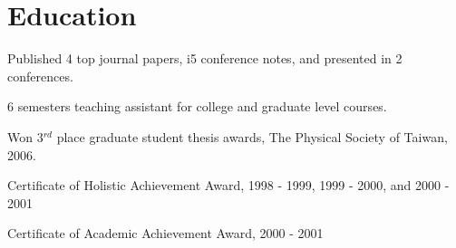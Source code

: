 \documentclass[letterpaper]{deedy-resume-openfont}
\begin{document}


\section{Education} 

\begin{tightemize}
\item Published 4 top journal papers, i5 conference notes, and presented in 2 conferences.
\item 6 semesters teaching assistant for college and graduate level courses.
\end{tightemize}
\sectionsep

\begin{tightemize}
\item Won 3$^{rd}$ place graduate student thesis awards, The Physical Society of Taiwan, 2006.
\end{tightemize}
\sectionsep

\begin{tightemize}
\item Certificate of Holistic Achievement Award, 1998 - 1999, 1999 - 2000, and 2000 - 2001
\item Certificate of Academic Achievement Award, 2000 - 2001
\end{tightemize}
\sectionsep
\end{document}
